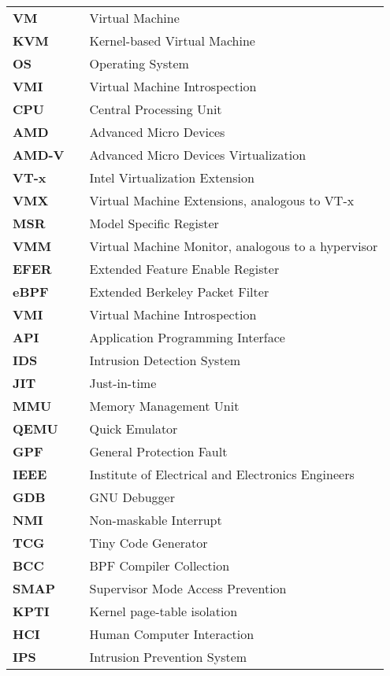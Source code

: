 \documentclass{report}
\begin{document}
\begin{spacing}{1.5}
\begin{tabular}{lcl}
\large{\bf VM}  & & \large{Virtual Machine} \\
\large{\bf KVM}  & & \large{Kernel-based Virtual Machine} \\
\large{\bf OS}   & & \large{Operating System}        \\
\large{\bf VMI}  & & \large{Virtual Machine Introspection} \\
\large{\bf CPU}  & & \large{Central Processing Unit} \\
\large{\bf AMD}  & & \large{Advanced Micro Devices} \\
\large{\bf AMD-V}  & & \large{Advanced Micro Devices Virtualization} \\
\large{\bf VT-x}  & & \large{Intel Virtualization Extension} \\
\large{\bf VMX}  & & \large{Virtual Machine Extensions, analogous to VT-x} \\
\large{\bf MSR}  & & \large{Model Specific Register} \\
\large{\bf VMM}  & & \large{Virtual Machine Monitor, analogous to a hypervisor} \\
\large{\bf EFER}  & & \large{Extended Feature Enable Register} \\
\large{\bf eBPF}  & & \large{Extended Berkeley Packet Filter} \\
\large{\bf VMI}  & & \large{Virtual Machine Introspection} \\
\large{\bf API}  & & \large{Application Programming Interface} \\
\large{\bf IDS}  & & \large{Intrusion Detection System} \\
\large{\bf JIT}  & & \large{Just-in-time} \\
\large{\bf MMU}  & & \large{Memory Management Unit} \\
\large{\bf QEMU}  & & \large{Quick Emulator} \\
\large{\bf GPF}  & & \large{General Protection Fault} \\
\large{\bf IEEE}  & & \large{Institute of Electrical and Electronics Engineers} \\
\large{\bf GDB}  & & \large{GNU Debugger} \\
\large{\bf NMI}  & & \large{Non-maskable Interrupt} \\
\large{\bf TCG}  & & \large{Tiny Code Generator} \\
\large{\bf BCC}  & & \large{BPF Compiler Collection} \\
\large{\bf SMAP}  & & \large{Supervisor Mode Access Prevention} \\
\large{\bf KPTI}  & & \large{Kernel page-table isolation} \\
\large{\bf HCI}  & & \large{Human Computer Interaction} \\
\large{\bf IPS}  & & \large{Intrusion Prevention System} \\
\end{tabular}















\end{spacing}
\end{document}
